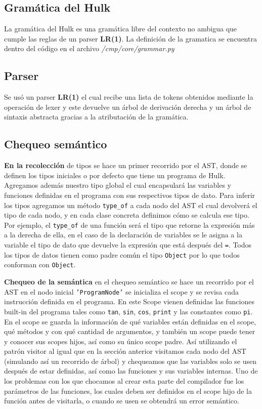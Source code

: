 \documentclass[12pt]{article}
\begin{document}
\subsection{Gramática del Hulk}
La gramática del Hulk es una gramática libre del contexto no ambigua que cumple las reglas de un parser \textbf{LR(1)}. La definición de la gramatica se encuentra dentro del código en el archivo \textit{/cmp/core/grammar.py}

\subsection{Parser}
Se usó un parser \textbf{LR(1)} el cual recibe una lista de tokens obtenidos mediante la operación de lexer y este devuelve un árbol de derivación derecha y un árbol de sintaxis abstracta gracias a la atributación de la gramática.

\subsection{Chequeo semántico}

\textbf{En la recolección} de tipos se hace un primer recorrido por el AST, donde se definen los tipos iniciales o por defecto que tiene un programa de Hulk. Agregamos además nuestro tipo global el cual encapsulará las variables y funciones definidas en el programa con sus respectivos tipos de dato. Para inferir los tipos agregamos un método \texttt{type\_of} a cada nodo del AST el cual devolverá el tipo de cada nodo, y en cada clase concreta definimos cómo se calcula ese tipo. Por ejemplo, el \texttt{type\_of} de una función será el tipo que retorne la expresión más a la derecha de ella, en el caso de la declaración de variables se le asigna a la variable el tipo de dato que devuelve la expresión que está después del \texttt{=}. Todos los tipos de datos tienen como padre común el tipo \texttt{Object} por lo que todos conforman con \texttt{Object}.

\textbf{Chequeo de la semántica} en el chequeo semántico se hace un recorrido por el AST en el nodo inicial \texttt{'ProgramNode'} se inicializa el scope y se revisa cada instrucción definida en el programa. En este Scope vienen definidas las funciones built-in del programa tales como \texttt{tan}, \texttt{sin}, \texttt{cos}, \texttt{print} y las constantes como \texttt{pi}. En el scope se guarda la información de qué variables están definidas en el scope, qué métodos y con qué cantidad de argumentos, y también un scope puede tener y conocer sus scopes hijos, así como su único scope padre. Así utilizando el patrón visitor al igual que en la sección anterior visitamos cada nodo del AST (simulando así un recorrido de árbol) y chequeamos que las variables solo se usen después de estar definidas, así como las funciones y sus variables internas. Uno de los problemas con los que chocamos al crear esta parte del compilador fue los parámetros de las funciones, los cuales deben ser definidos en el scope hijo de la función antes de visitarla, o cuando se usen se obtendrá un error semántico.
\end{document}
